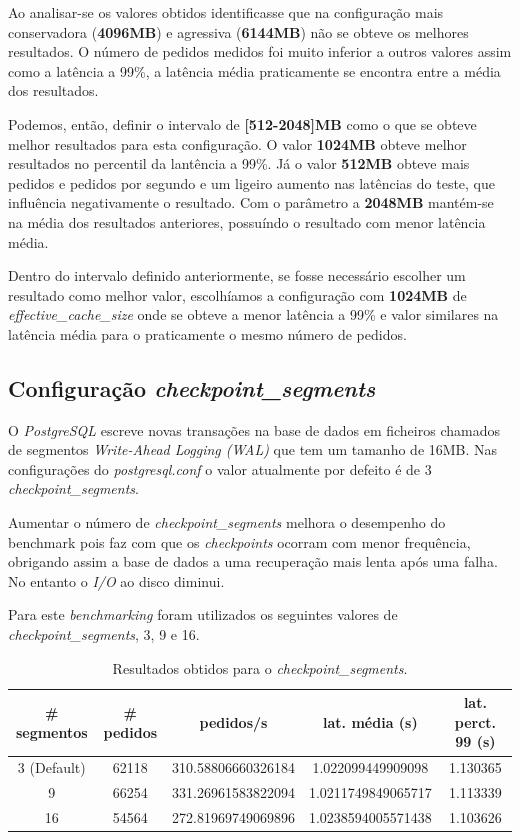 Ao analisar-se os valores obtidos identificasse que na configuração mais conservadora (\textbf{4096MB}) e agressiva (\textbf{6144MB}) não se obteve os melhores resultados. O número de pedidos medidos foi muito inferior a outros valores assim como a latência a 99\%, a latência média praticamente se encontra entre a média dos resultados.

Podemos, então, definir o intervalo de \textbf{[512-2048]MB} como o que se obteve melhor resultados para esta configuração. O valor \textbf{1024MB} obteve melhor resultados no percentil da lantência a 99\%. Já o valor \textbf{512MB} obteve mais pedidos e pedidos por segundo e um ligeiro aumento nas latências do teste, que influência negativamente o resultado. Com o parâmetro a \textbf{2048MB} mantém-se na média dos resultados anteriores, possuíndo o resultado com menor latência média.

Dentro do intervalo definido anteriormente, se fosse necessário escolher um resultado como melhor valor, escolhíamos a configuração com \textbf{1024MB} de \textit{effective\_cache\_size} onde se obteve a menor latência a 99\% e valor similares na latência média para o praticamente o mesmo número de pedidos.

\newpage

\subsection{Configuração \textit{checkpoint\_segments}}

O \textit{PostgreSQL} escreve novas transações na base de dados em ficheiros chamados de segmentos \textit{Write-Ahead Logging (WAL)} que tem um tamanho de 16MB. Nas configurações do \textit{postgresql.conf} o valor atualmente por defeito é de 3 \textit{checkpoint\_segments}.

Aumentar o número de \textit{checkpoint\_segments} melhora o desempenho do benchmark pois faz com que os \textit{checkpoints} ocorram com menor frequência, obrigando assim a base de dados a uma recuperação mais lenta após uma falha. No entanto o \textit{I/O} ao disco diminui.

Para este \textit{benchmarking} foram utilizados os seguintes valores de \textit{checkpoint\_segments}, 3, 9 e 16.

\begin{table}[!h]
\center
\small
\begin{tabular}{|c|c|c|c|c|}
\hline
\textbf{\# segmentos} & \textbf{\# pedidos} & \textbf{pedidos/s} & \textbf{lat. média (s)} & \textbf{lat. perct. 99 (s)}  \\ \hline
3 (Default) & 62118 & 310.58806660326184 & 1.022099449909098 & 1.130365  \\ \hline
9 & 66254 & 331.26961583822094 & 1.0211749849065717 & 1.113339  \\ \hline
16 & 54564 & 272.81969749069896 & 1.0238594005571438 & 1.103626  \\ \hline
\end{tabular}
\caption{Resultados obtidos para o \textit{checkpoint\_segments}.}
\end{table}

